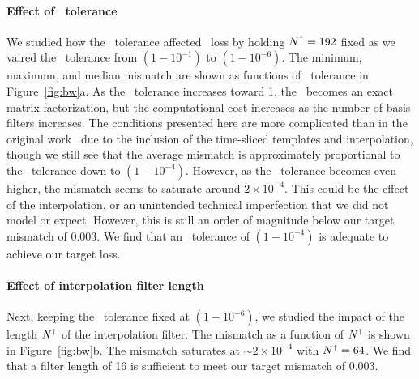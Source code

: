 \paragraph{Effect of \SVD\ tolerance}

We studied how the \SVD\ tolerance affected \SNR\ loss by holding
$N^\shortuparrow = 192$ fixed as we vaired the \SVD\ tolerance from
$\left(1-10^{-1}\right)$ to $\left(1-10^{-6}\right)$.  The minimum, maximum, and median
mismatch are shown as functions of \SVD\ tolerance in
Figure~\ref{fig:bw}a.  As the \SVD\ tolerance increases toward 1, the
\SVD\ becomes an exact matrix factorization, but the computational cost increases as
the number of basis filters increases.  The conditions presented here are more
complicated than in the original work~\citep{Cannon:2010p10398} due to the inclusion
of the time-sliced templates and interpolation, though we still see that the average
mismatch is approximately proportional to the \SVD\ tolerance down to
$\left(1-10^{-4}\right)$.  However, as the \SVD\ tolerance becomes even higher, the
mismatch seems to saturate around $2 \times 10^{-4}$.  This could be the effect of the
interpolation, or an unintended technical imperfection that we did not model or expect.
However, this is still an order of magnitude below our target mismatch of 0.003.  We
find that an \SVD\ tolerance of $\left(1-10^{-4}\right)$ is adequate to achieve our
target \SNR{} loss.

\paragraph{Effect of interpolation filter length}

Next, keeping the \SVD\ tolerance fixed at $\left(1-10^{-6}\right)$, we studied the
impact of the length $N^\shortuparrow$ of the interpolation filter.  The mismatch as
a function of $N^\shortuparrow$ is shown in Figure~\ref{fig:bw}b.  The
mismatch saturates at $\sim 2 \times 10^{-4}$ with $N^\shortuparrow = 64$.  We find
that a filter length of 16 is sufficient to meet our target mismatch of 0.003.

